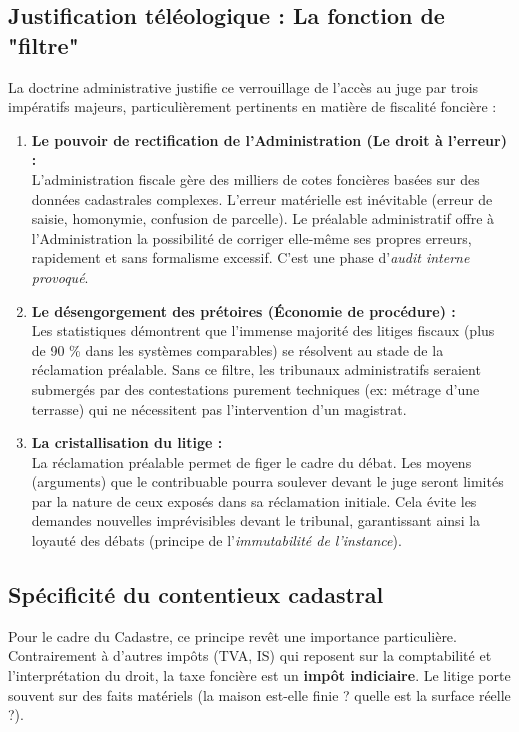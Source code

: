 \documentclass[Cours_contentieuxTF2026.tex]{subfiles}
\begin{document}
\subsection{Justification téléologique : La fonction de "filtre"}
La doctrine administrative justifie ce verrouillage de l'accès au juge par trois impératifs majeurs, particulièrement pertinents en matière de fiscalité foncière :

\begin{enumerate}
	\item \textbf{Le pouvoir de rectification de l'Administration (Le droit à l'erreur) :} \\
	L'administration fiscale gère des milliers de cotes foncières basées sur des données cadastrales complexes. L'erreur matérielle est inévitable (erreur de saisie, homonymie, confusion de parcelle). Le préalable administratif offre à l'Administration la possibilité de corriger elle-même ses propres erreurs, rapidement et sans formalisme excessif. C'est une phase d'\textit{audit interne provoqué}.
	
	\item \textbf{Le désengorgement des prétoires (Économie de procédure) :} \\
	Les statistiques démontrent que l'immense majorité des litiges fiscaux (plus de 90 \% dans les systèmes comparables) se résolvent au stade de la réclamation préalable. Sans ce filtre, les tribunaux administratifs seraient submergés par des contestations purement techniques (ex: métrage d'une terrasse) qui ne nécessitent pas l'intervention d'un magistrat.
	
	\item \textbf{La cristallisation du litige :} \\
	La réclamation préalable permet de figer le cadre du débat. Les moyens (arguments) que le contribuable pourra soulever devant le juge seront limités par la nature de ceux exposés dans sa réclamation initiale. Cela évite les demandes nouvelles imprévisibles devant le tribunal, garantissant ainsi la loyauté des débats (principe de l'\textit{immutabilité de l'instance}).
\end{enumerate}

\subsection{Spécificité du contentieux cadastral}
Pour le cadre du Cadastre, ce principe revêt une importance particulière. Contrairement à d'autres impôts (TVA, IS) qui reposent sur la comptabilité et l'interprétation du droit, la taxe foncière est un \textbf{impôt indiciaire}. Le litige porte souvent sur des faits matériels (la maison est-elle finie ? quelle est la surface réelle ?).
\end{document}
